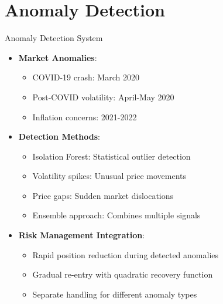\documentclass[aspectratio=169,xcolor=dvipsnames]{beamer}
\begin{document}
\section{Anomaly Detection}
\begin{frame}{Anomaly Detection System}
	\begin{itemize}
		\item \textbf{Market Anomalies}:
		      \begin{itemize}
			      \item COVID-19 crash: March 2020
			      \item Post-COVID volatility: April-May 2020
			      \item Inflation concerns: 2021-2022
		      \end{itemize}
		\item \textbf{Detection Methods}:
		      \begin{itemize}
			      \item Isolation Forest: Statistical outlier detection
			      \item Volatility spikes: Unusual price movements
			      \item Price gaps: Sudden market dislocations
			      \item Ensemble approach: Combines multiple signals
		      \end{itemize}
		\item \textbf{Risk Management Integration}:
		      \begin{itemize}
			      \item Rapid position reduction during detected anomalies
			      \item Gradual re-entry with quadratic recovery function
			      \item Separate handling for different anomaly types
		      \end{itemize}
	\end{itemize}
\end{frame}
\end{document}
